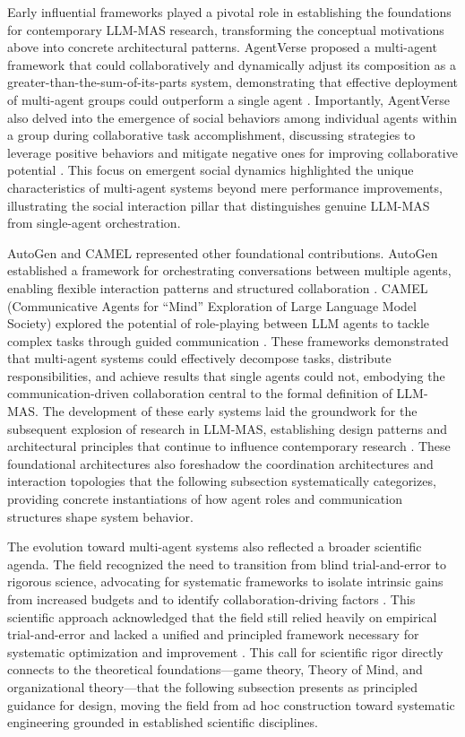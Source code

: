 \documentclass[11pt]{article}
\begin{document}
Early influential frameworks played a pivotal role in establishing the foundations for contemporary LLM-MAS research, transforming the conceptual motivations above into concrete architectural patterns. AgentVerse proposed a multi-agent framework that could collaboratively and dynamically adjust its composition as a greater-than-the-sum-of-its-parts system, demonstrating that effective deployment of multi-agent groups could outperform a single agent \cite{ref16}. Importantly, AgentVerse also delved into the emergence of social behaviors among individual agents within a group during collaborative task accomplishment, discussing strategies to leverage positive behaviors and mitigate negative ones for improving collaborative potential \cite{ref16}. This focus on emergent social dynamics highlighted the unique characteristics of multi-agent systems beyond mere performance improvements, illustrating the social interaction pillar that distinguishes genuine LLM-MAS from single-agent orchestration.

AutoGen and CAMEL represented other foundational contributions. AutoGen established a framework for orchestrating conversations between multiple agents, enabling flexible interaction patterns and structured collaboration \cite{ref2}. CAMEL (Communicative Agents for ``Mind'' Exploration of Large Language Model Society) explored the potential of role-playing between LLM agents to tackle complex tasks through guided communication \cite{ref1}. These frameworks demonstrated that multi-agent systems could effectively decompose tasks, distribute responsibilities, and achieve results that single agents could not, embodying the communication-driven collaboration central to the formal definition of LLM-MAS. The development of these early systems laid the groundwork for the subsequent explosion of research in LLM-MAS, establishing design patterns and architectural principles that continue to influence contemporary research \cite{ref20}. These foundational architectures also foreshadow the coordination architectures and interaction topologies that the following subsection systematically categorizes, providing concrete instantiations of how agent roles and communication structures shape system behavior.

The evolution toward multi-agent systems also reflected a broader scientific agenda. The field recognized the need to transition from blind trial-and-error to rigorous science, advocating for systematic frameworks to isolate intrinsic gains from increased budgets and to identify collaboration-driving factors \cite{ref21}. This scientific approach acknowledged that the field still relied heavily on empirical trial-and-error and lacked a unified and principled framework necessary for systematic optimization and improvement \cite{ref21}. This call for scientific rigor directly connects to the theoretical foundations---game theory, Theory of Mind, and organizational theory---that the following subsection presents as principled guidance for design, moving the field from ad hoc construction toward systematic engineering grounded in established scientific disciplines.
\end{document}
